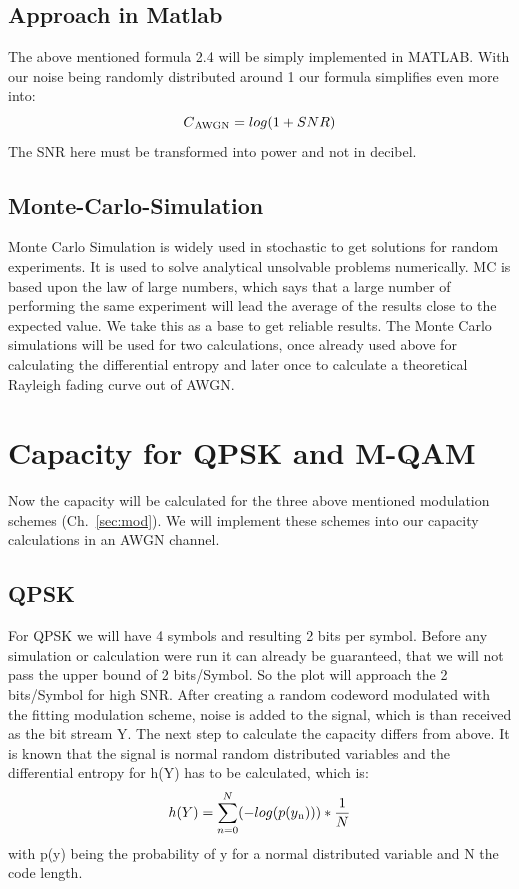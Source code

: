 \documentclass[12pt,oneside, reqno]{report}
\begin{document}
\subsection{Approach in Matlab}
The above mentioned formula 2.4 will be simply implemented in MATLAB. With our noise being randomly distributed around 1 our formula simplifies even more into:
\begin{equation}
\label{eq:AWGN}
C\textsubscript{AWGN} = log(1+SNR) 
\end{equation} 
The SNR here must be transformed into power and not in decibel.

\subsection{Monte-Carlo-Simulation}
\label{sec:MCS}
Monte Carlo Simulation is widely used in stochastic to get solutions for random experiments. It is used to solve analytical unsolvable problems numerically. MC is based upon the law of large numbers, which says that a large number of performing the same experiment will lead the average of the results close to the expected value. We take this as a base to get reliable results. The Monte Carlo simulations will be used for two calculations, once already used above for calculating the differential entropy and later once to calculate a theoretical Rayleigh fading curve out of AWGN. 

\section{Capacity for QPSK and M-QAM}
Now the capacity will be calculated for the three above mentioned modulation schemes (Ch.~\autoref{sec:mod}). We will implement these schemes into our capacity calculations in an AWGN channel.
\subsection{QPSK}
For QPSK we will have 4 symbols and resulting 2 bits per symbol. Before any simulation or calculation were run it can already be guaranteed, that we will not pass the upper bound of 2 bits/Symbol. So the plot will approach the 2 bits/Symbol for high SNR.
After creating a random codeword modulated with the fitting modulation scheme, noise is added to the signal, which is than received as the bit stream Y. The next step to calculate the capacity differs from above. 
\newline
It is known that the signal is normal random distributed variables and the differential entropy for h(Y) has to be calculated, which is: 
\begin{equation}
\label{eq:entropy}
h(Y) =  \sum_{n=0}^N(-log(p(y\textsubscript{n}))) * \frac{1}{N}
\end{equation} 
with p(y) being the probability of y for a normal distributed variable and N the code length.
\end{document}
